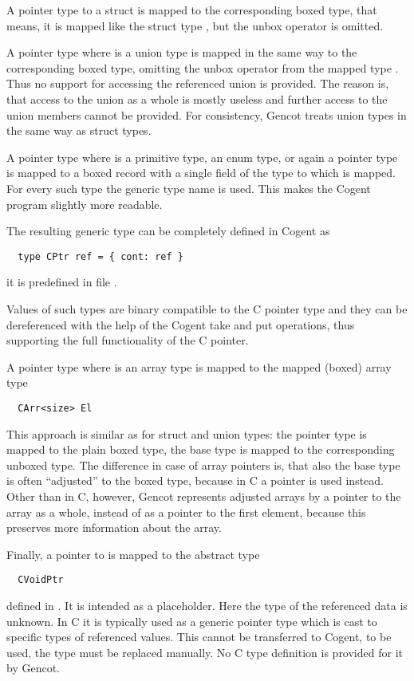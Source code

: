 A pointer type  to a struct is mapped to the corresponding boxed type, 
that means, it is mapped like the struct type , but the unbox operator is omitted.

A pointer type  where  is a union type is mapped in the same way to the corresponding
boxed type, omitting the unbox operator from the mapped type . Thus no support for accessing
the referenced union is provided. The reason is, that access to the union as a whole is mostly useless
and further access to the union members cannot be provided. For consistency, Gencot treats union types
in the same way as struct types.

A pointer type  where  is a primitive type, an enum type, 
or again a pointer type is mapped to a boxed record with a single field  of the type  to which  is 
mapped. For every such type the generic type  name is used. This makes the 
Cogent program slightly more readable. 

The resulting generic type can be completely defined in Cogent as
\begin{verbatim}
  type CPtr ref = { cont: ref }
\end{verbatim}
it is predefined in file .

Values of such types are binary compatible to the C pointer type and they can be dereferenced with the help of
the Cogent take and put operations, thus supporting the full functionality of the C pointer.

A pointer type  where  is an array type is mapped to the mapped (boxed) array type 
\begin{verbatim}
  CArr<size> El
\end{verbatim}
This approach is similar as for struct and union types: the pointer type is mapped to the plain boxed type,
the base type is mapped to the corresponding unboxed type. The difference in case of array pointers is, that also the base
type is often ``adjusted'' to the boxed type, because in C a pointer is used instead. Other than in C, however, Gencot
represents adjusted arrays by a pointer to the array as a whole, instead of as a pointer to the first element, because
this preserves more information about the array.

Finally, a pointer to  is mapped to the abstract type
\begin{verbatim}
  CVoidPtr
\end{verbatim}
defined in .
It is intended as a placeholder. Here the type of the referenced data is unknown. In C it is typically used 
as a generic pointer type which is cast to specific types of referenced values. This cannot be transferred to
Cogent, to be used, the type must be replaced manually. No C type definition is provided for it by Gencot.

